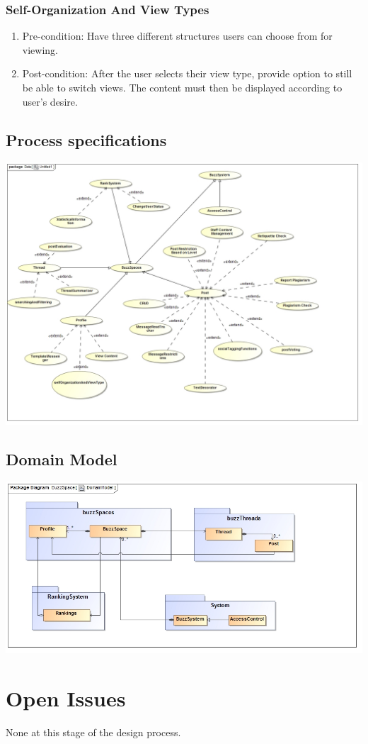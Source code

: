 \documentclass[hidelinks, 12pt, oneside]{article}
\begin{document}
\subsubsection{Self-Organization And View Types}
\begin{enumerate}
\item Pre-condition: Have three different structures users can choose from for viewing.
\item Post-condition: After the user selects their view type, provide option to still be able to switch views. The content must then be displayed according to user's desire.
\end{enumerate}

\subsection{Process specifications}
 \centerline{\includegraphics[scale=0.48]{ProcessSpecification}}
 \newpage
\subsection{Domain Model}
 \centerline{\includegraphics[scale=0.4]{DomainModel}}
\section{Open Issues}
 None at this stage of the design process.
\end{document}

